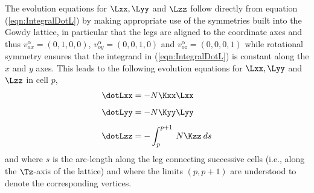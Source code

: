 \documentclass[a4paper,12pt]{article}
\numberwithin{equation}{section}
\begin{document}
The evolution equations for $\Lxx,\Lyy$ and $\Lzz$ follow directly from equation
(\ref{eqn:IntegralDotL}) by making appropriate use of the symmetries built into the Gowdy
lattice, in particular that the legs are aligned to the coordinate axes and thus
$v^\alpha_{ox}=(0,1,0,0)$, $v^\alpha_{oy}=(0,0,1,0)$ and $v^\alpha_{oz}=(0,0,0,1)$ while
rotational symmetry ensures that the integrand in (\ref{eqn:IntegralDotL}) is constant along
the $x$ and $y$ axes. This leads to the following evolution equations for $\Lxx,\Lyy$ and
$\Lzz$ in cell $p$,
\begin{align}
   \label{eqn:DotGowdyLxx}\dotLxx &= -N\Kxx\Lxx\\[5pt]
   \label{eqn:DotGowdyLyy}\dotLyy &= -N\Kyy\Lyy\\[5pt]
   \label{eqn:DotGowdyLzz}\dotLzz &= -\int_{p}^{p+1}\>N\Kzz\>ds
\end{align}
and where $s$ is the arc-length along the leg connecting successive cells (i.e., along the
$\Tz$-axis of the lattice) and where the limits $(p,p+1)$ are understood to denote the
corresponding vertices.
\end{document}

